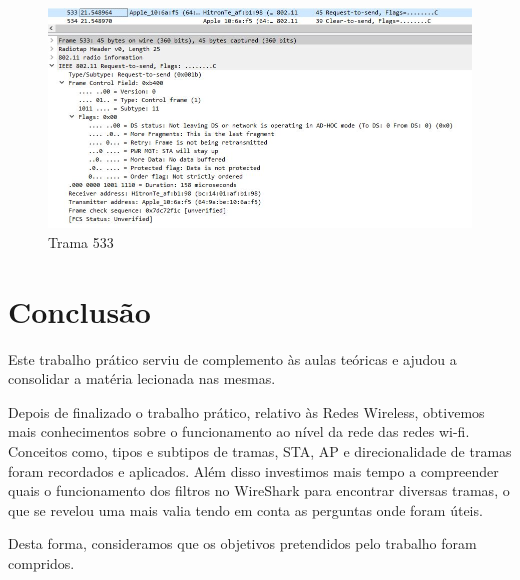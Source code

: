 \documentclass{article}
\begin{document}
\begin{figure}[h]
	\centering
	\includegraphics[scale = 0.5]{ex-18-trama533.JPG}
	\caption{Trama 533}
\end{figure}

\section{Conclusão}
Este trabalho prático serviu de complemento às aulas teóricas e ajudou a consolidar a matéria lecionada nas mesmas.\par
Depois de finalizado o trabalho prático, relativo às Redes Wireless, obtivemos mais conhecimentos sobre o funcionamento ao nível da rede das redes wi-fi.
Conceitos como, tipos e subtipos de tramas, STA, AP e direcionalidade de tramas foram recordados e aplicados. Além disso investimos mais tempo a compreender quais o funcionamento dos filtros no WireShark para encontrar diversas tramas, o que se revelou uma mais valia tendo em conta as perguntas onde foram úteis.\par
Desta forma, consideramos que os objetivos pretendidos pelo trabalho foram compridos.
\end{document}
